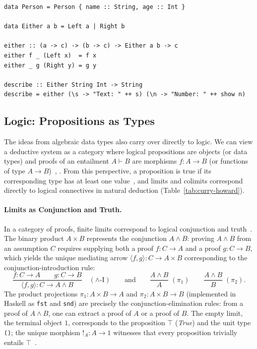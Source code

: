\lstset{language=Haskell, captionpos=b, basicstyle=\ttfamily\small, keywordstyle=\bfseries}
\begin{lstlisting}[caption={Product (record) and coproduct (sum) types in Haskell, with \texttt{either} implementing the universal mediating arrow $\lbrack f, g\rbrack$.}, label=lst:haskell-adt, float=tb]
data Person = Person { name :: String, age :: Int }

data Either a b = Left a | Right b

either :: (a -> c) -> (b -> c) -> Either a b -> c
either f _ (Left x)  = f x
either _ g (Right y) = g y

describe :: Either String Int -> String
describe = either (\s -> "Text: " ++ s) (\n -> "Number: " ++ show n)
\end{lstlisting}

\subsection{Logic: Propositions as Types}
\label{sec:logic}

The ideas from algebraic data types also carry over directly to logic. We can view a deductive system as a category where logical propositions are objects (or data types) and proofs of an entailment $A \vdash B$ are morphisms $f \colon A \to B$ (or functions of type $A \to B$)~\cite[Sec.~1.4, Ex.~10]{Awodey10}, \cite[Sec.~3.2.6]{RydeheardBurstall88}. From this perspective, a proposition is true if its corresponding type has at least one value~\cite[Sec.~9.6]{Milewski18}, and limits and colimits correspond directly to logical connectives in natural deduction (Table~\ref{tab:curry-howard}).

\paragraph{Limits as Conjunction and Truth.}
In a category of proofs, finite limits correspond to logical conjunction and truth~\cite[Sec.~3.2.6]{RydeheardBurstall88}. The binary product $A \times B$ represents the conjunction $A \land B$: proving $A \land B$ from an assumption $C$ requires supplying both a proof $f \colon C \to A$ and a proof $g \colon C \to B$, which yields the unique mediating arrow $\langle f, g \rangle \colon C \to A \times B$ corresponding to the conjunction-introduction rule:
\[
  \frac{f \colon C \to A \qquad g \colon C \to B}
       {\langle f, g \rangle \colon C \to A \land B}
  \quad (\land\text{-I})
  \qquad\text{and}\qquad
  \frac{A \land B}{A} \; (\pi_1)
  \qquad
  \frac{A \land B}{B} \; (\pi_2).
\]
The product projections $\pi_1 \colon A \times B \to A$ and $\pi_2 \colon A \times B \to B$ (implemented in Haskell as \texttt{fst} and \texttt{snd}) are precisely the conjunction-elimination rules: from a proof of $A \land B$, one can extract a proof of $A$ or a proof of $B$. The empty limit, the terminal object $1$, corresponds to the proposition $\top$ (\emph{True}) and the unit type \texttt{()}; the unique morphism $!_A \colon A \to 1$ witnesses that every proposition trivially entails $\top$~\cite[Sec.~6.4, 9.6]{Milewski18}.

